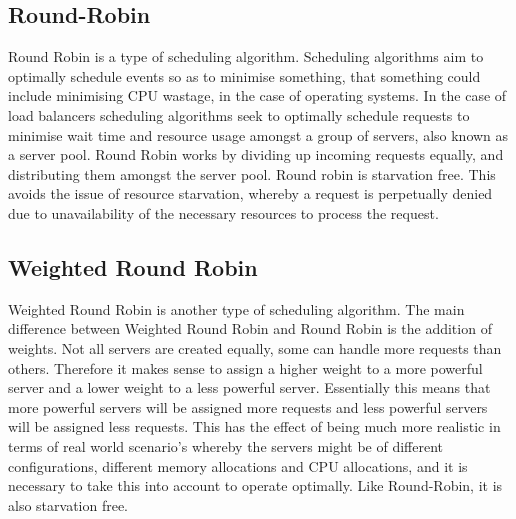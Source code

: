 \documentclass[12pt]{article}
\begin{document}
\subsection{Round-Robin}
Round Robin is a type of scheduling algorithm\cite{RR}. Scheduling algorithms aim to optimally schedule events so as to minimise something, that something could include minimising CPU wastage, in the case of operating systems. In the case of load balancers scheduling algorithms seek to optimally schedule requests to minimise wait time and resource usage amongst a group of servers, also known as a server pool. Round Robin works by dividing up incoming requests equally, and distributing them amongst the server pool. Round robin is starvation free. This avoids the issue of resource starvation, whereby a request is perpetually denied due to unavailability of the necessary resources to process the request. 


\subsection{Weighted Round Robin}
Weighted Round Robin is another type of scheduling algorithm\cite{WRR}. The main difference between Weighted Round Robin and Round Robin is the addition of weights. Not all servers are created equally, some can handle more requests than others. Therefore it makes sense to assign a higher weight to a more powerful server and a lower weight to a less powerful server. Essentially this means that more powerful servers will be assigned more requests and less powerful servers will be assigned less requests. This has the effect of being much more realistic in terms of real world scenario's whereby the servers might be of different configurations, different memory allocations and CPU allocations, and it is necessary to take this into account to operate optimally. Like Round-Robin, it is also starvation free. 
\end{document}
